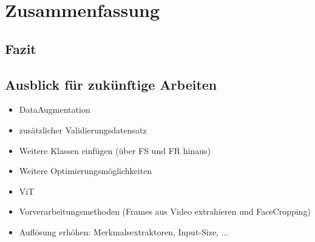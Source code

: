 \documentclass{article}
\begin{document}
    \section{Zusammenfassung}
    \subsection{Fazit}
    \subsection{Ausblick für zukünftige Arbeiten}
    \begin{itemize}
        \item DataAugmentation
        \item zusätzlicher Validierungsdatensatz %
        \item Weitere Klassen einfügen (über FS und FR hinaus)
        \item Weitere Optimierungsmöglichkeiten
        \item ViT
        \item Vorverarbeitungsmethoden (Frames aus Video extrahieren und FaceCropping)
        \item Auflösung erhöhen: Merkmalsextraktoren, Input-Size, ...
    \end{itemize}

    
    
\end{document}
